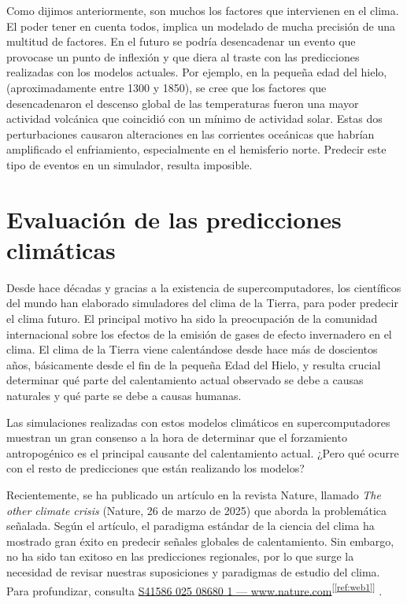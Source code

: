 \documentclass[
  10pt,
  a4paper,
  DIV=11,
  numbers=noendperiod,
  open=any]{scrreprt}
\numberwithin{equation}{chapter}
\numberwithin{equation}{section}
\renewcommand{\[}{\begin{equation}}
\renewcommand{\]}{\end{equation}}
\newcommand{\refweb}[3]{%
  \href{#1}{#2}\textsuperscript{[\ref{ref:#3}]}%
}
\begin{document}
Como dijimos anteriormente, son muchos los factores que intervienen en
el clima. El poder tener en cuenta todos, implica un modelado de mucha
precisión de una multitud de factores. En el futuro se podría
desencadenar un evento que provocase un punto de inflexión y que diera
al traste con las predicciones realizadas con los modelos actuales. Por
ejemplo, en la pequeña edad del hielo, (aproximadamente entre 1300 y
1850), se cree que los factores que desencadenaron el descenso global de
las temperaturas fueron una mayor actividad volcánica que coincidió con
un mínimo de actividad solar. Estas dos perturbaciones causaron
alteraciones en las corrientes oceánicas que habrían amplificado el
enfriamiento, especialmente en el hemisferio norte. Predecir este
tipo de eventos en un simulador, resulta imposible.


\chapter{Evaluación de las predicciones
climáticas}\label{evaluacion-de-las-predicciones-climuxe1ticas}

Desde hace décadas y gracias a la existencia de supercomputadores, los
científicos del mundo han elaborado simuladores del clima de la Tierra,
para poder predecir el clima futuro. El principal motivo ha sido la
preocupación de la comunidad internacional sobre los efectos de la
emisión de gases de efecto invernadero en el clima. El clima de la
Tierra viene calentándose desde hace más de doscientos años, básicamente
desde el fin de la pequeña Edad del Hielo, y resulta crucial determinar
qué parte del calentamiento actual observado se debe a causas naturales
y qué parte se debe a causas humanas.

Las simulaciones realizadas con estos modelos climáticos en
supercomputadores muestran un gran consenso a la hora de determinar que
el forzamiento antropogénico es el principal causante del calentamiento
actual. ¿Pero qué ocurre con el resto de predicciones que están
realizando los modelos?

Recientemente, se ha publicado un artículo en la revista Nature, llamado
\emph{The other climate crisis} (Nature, 26 de marzo de 2025) que aborda
la problemática señalada. Según el artículo, el paradigma estándar de la
ciencia del clima ha mostrado gran éxito en predecir señales globales de
calentamiento. Sin embargo, no ha sido tan exitoso en las predicciones
regionales, por lo que surge la necesidad de revisar nuestras suposiciones y
paradigmas de estudio del clima. Para profundizar, consulta
\refweb{https://www.nature.com/articles/s41586-025-08680-1}{S41586 025 08680 1 — www.nature.com}{web1}.
\end{document}
